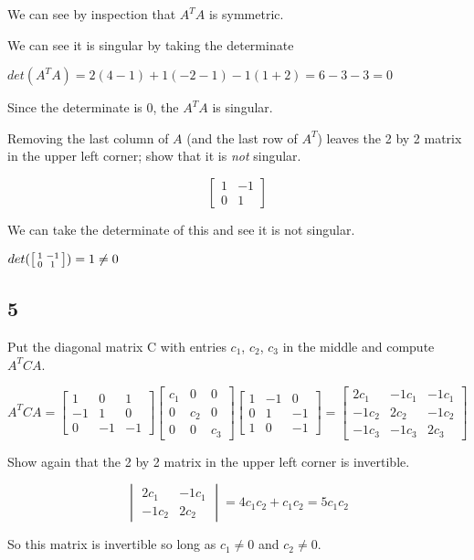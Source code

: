 \documentclass[12pt,letterpaper]{article}
\begin{document}
      We can see by inspection that $A^TA$ is symmetric.

      We can see it is singular by taking the determinate

      $det(A^TA) = 2(4-1)+1(-2-1)-1(1+2) = 6 - 3 - 3 = 0$

      Since the determinate is 0, the $A^TA$ is singular.

      Removing the last column of $A$ (and the last row of $A^T$) leaves the 2 by 2 matrix in the upper left corner; show that it is \textit{not} singular.

      \[
        \begin{bmatrix}
          1 & -1 \\
          0 & 1
        \end{bmatrix}
      \]

      We can take the determinate of this and see it is not singular.

      $det(\begin{bsmallmatrix}1 & -1 \\ 0 & 1\end{bsmallmatrix}) = 1 \ne 0$
    \subsection*{5}
      Put the diagonal matrix C with entries $c_1$, $c_2$, $c_3$ in the middle and compute $A^TCA$.

      \[
        A^TCA
        =
        \begin{bmatrix}
          1 & 0 & 1 \\
          -1 & 1 & 0 \\
          0 & -1 & -1
        \end{bmatrix}
        \begin{bmatrix}
          c_1 & 0 & 0 \\
          0 & c_2 & 0 \\
          0 & 0 & c_3
        \end{bmatrix}
        \begin{bmatrix}
          1 & -1 & 0 \\
          0 & 1 & -1 \\
          1 & 0 & -1
        \end{bmatrix}
        =
        \begin{bmatrix}
          2c_1 & -1c_1 & -1c_1 \\
          -1c_2 & 2c_2 & -1c_2 \\
          -1c_3 & -1c_3 & 2c_3
        \end{bmatrix}
      \]

      Show again that the 2 by 2 matrix in the upper left corner is invertible.

      \[
        \begin{vmatrix}
          2c_1 & -1c_1 \\
          -1c_2 & 2c_2
        \end{vmatrix}
        =
        4c_1c_2 + c_1c_2
        =
        5c_1c_2
      \]

      So this matrix is invertible so long as $c_1 \ne 0$ and $c_2 \ne 0$.
\end{document}
